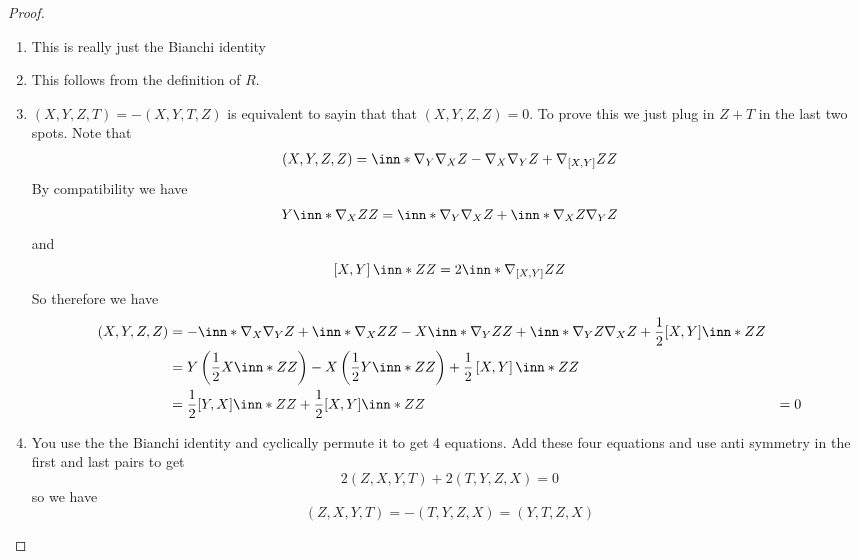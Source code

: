 \documentclass[a4paper]{article}
\begin{document}
 \begin{proof}
   \begin{enumerate}
     \item This is really just the Bianchi identity
     \item This follows from the definition of $R$.
     \item $(X,Y,Z,T) = -(X,Y,T,Z)$ is equivalent to sayin that that $(X,Y,Z,Z) = 0$. To prove this we just plug in $Z+T$ in the last two spots. Note that
       \[
         \begin{aligned}
           (X,Y,Z,Z) &=  \inn*{\nabla_Y\nabla_X Z - \nabla_X \nabla_Y Z + \nabla_{[X,Y]}Z}{ Z}  \\
         \end{aligned}
       \]
       By compatibility we have
       \[
         Y \inn*{\nabla_X Z}{Z} = \inn*{\nabla_Y \nabla_X}{Z} + \inn*{\nabla_X Z}{\nabla_Y Z}
       \]
       and
       \[
         \left[ X,Y \right] \inn*{Z}{Z} = 2 \inn*{\nabla_{[X,Y]}Z}{Z}
       \]
       So therefore we have
       \[
         \begin{aligned}
           (X,Y,Z,Z) &= -\inn*{\nabla_X}{\nabla_Y Z} + \inn*{\nabla_X Z}{Z} - X \inn*{\nabla_Y Z}{Z} + \inn*{\nabla_Y Z}{\nabla_X Z} + \frac{1}{2} [X,Y] \inn*{Z}{Z} \\
                     &= Y \left(\frac{1}{2} X \inn*{Z}{Z} \right) - X \left( \frac{1}{2} Y \inn*{Z}{Z} \right) + \frac{1}{2} \left[ X,Y \right] \inn*{Z}{Z} \\
                     &= \frac{1}{2} [Y,X] \inn*{Z}{Z} + \frac{1}{2} [X,Y] \inn*{Z}{Z}
                     &= 0
         \end{aligned}
       \]
     \item You use the the Bianchi identity and cyclically permute it to get 4 equations.  Add these four equations and use anti symmetry in the first and last pairs to get
       \[
         2(Z,X,Y,T) + 2(T,Y,Z,X) = 0
       \]
       so we have
       \[
         (Z,X,Y,T) = -(T,Y,Z,X) = (Y,T,Z,X)
       \]
   \end{enumerate}
  \end{proof}
\end{document}
